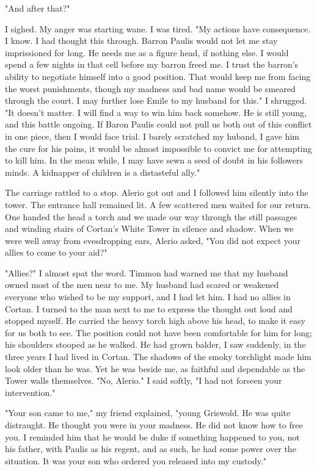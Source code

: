 \documentclass{article}
\begin{document}
"And after that?"

I sighed. My anger was starting wane. I was tired. "My actions have consequence. I know. I had thought this through. Barron Paulis would not let me stay imprissioned for long. He needs me as a figure head, if nothing else. I would spend a few nights in that cell before my barron freed me. I trust the barron's ability to negotiate himself into a good position. That would keep me from facing the worst punishments, though my madness and bad name would be smeared through the court. I may further lose Emile to my husband for this." I shrugged. "It doesn't matter. I will find a way to win him back somehow. He is still young, and this battle ongoing. If Baron Paulis could not pull us both out of this conflict in one piece, then I would face trial. I barely scratched my huband, I gave him the cure for his pains, it would be almost impossible to convict me for attempting to kill him. In the mean while, I may have sewn a seed of doubt in his followers minds. A kidnapper of children is a distasteful ally."

The carriage rattled to a stop. Alerio got out and I followed him silently into the tower. The entrance hall remained lit. A few scattered men waited for our return. One handed the head a torch and we made our way through the still passages and winding stairs of Cortan's White Tower in silence and shadow. When we were well away from evesdropping ears, Alerio asked, "You did not expect your allies to come to your aid?"

"Allies?" I almost spat the word. Timmon had warned me that my husband owned most of the men near to me. My husband had scared or weakened everyone who wished to be my support, and I had let him. I had no allies in Cortan. I turned to the man next to me to express the thought out loud and stopped myself. He carried the heavy torch high above his head, to make it easy for us both to see. The position could not have been comfortable for him for long; his shoulders stooped as he walked. He had grown balder, I saw suddenly, in the three years I had lived in Cortan. The shadows of the smoky torchlight made him look older than he was. Yet he was beside me, as faithful and dependable as the Tower walls themselves. "No, Alerio." I said softly, "I had not forseen your intervention."

"Your son came to me," my friend explained, "young Griswold. He was quite distraught. He thought you were in your madness. He did not know how to free you. I reminded him that he would be duke if something happened to you, not his father, with Paulis as his regent, and as such, he had some power over the situation. It was your son who ordered you released into my custody."
\end{document}
